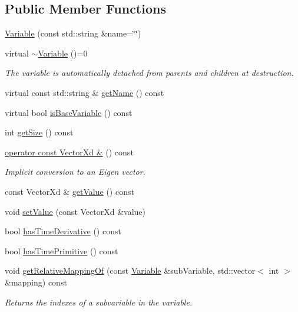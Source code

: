 \subsection*{Public Member Functions}
\begin{DoxyCompactItemize}
\item 
\hyperlink{classocra_1_1Variable_a36123e9d1eb81555292618b62a549c49}{Variable} (const std\+::string \&name=\char`\"{}\char`\"{})
\item 
virtual \hyperlink{classocra_1_1Variable_a689b72889b26a7a5280f2d13686f0a16}{$\sim$\+Variable} ()=0
\begin{DoxyCompactList}\small\item\em The variable is automatically detached from parents and children at destruction. \end{DoxyCompactList}\item 
virtual const std\+::string \& \hyperlink{classocra_1_1Variable_a4bfb964b527f719941cfe5c840e24028}{get\+Name} () const 
\item 
virtual bool \hyperlink{classocra_1_1Variable_a1c9a3b25c53a57499354c3c7581fd83a}{is\+Base\+Variable} () const 
\item 
int \hyperlink{classocra_1_1Variable_a6da81245b2bd4bb2fe794e08bbd58209}{get\+Size} () const 
\item 
\hyperlink{classocra_1_1Variable_a7e70a24f38773c67c31c5ea3389505bc}{operator const Vector\+Xd \&} () const 
\begin{DoxyCompactList}\small\item\em Implicit conversion to an Eigen vector. \end{DoxyCompactList}\item 
const Vector\+Xd \& \hyperlink{classocra_1_1Variable_a2f9c1b3fe2b115e2a2902bcba8efb9d3}{get\+Value} () const 
\item 
void \hyperlink{classocra_1_1Variable_a20990f33a83803b185f44f235d8a1be8}{set\+Value} (const Vector\+Xd \&value)
\item 
bool \hyperlink{classocra_1_1Variable_ac358daf838e870b9cd4dc3140f8fbe5a}{has\+Time\+Derivative} () const 
\item 
bool \hyperlink{classocra_1_1Variable_a40796e51f4c4debc6dee6d48466a1409}{has\+Time\+Primitive} () const 
\item 
void \hyperlink{classocra_1_1Variable_a0459c4576f1586d1c6fa2a345b4e52f4}{get\+Relative\+Mapping\+Of} (const \hyperlink{classocra_1_1Variable}{Variable} \&sub\+Variable, std\+::vector$<$ int $>$ \&mapping) const 
\begin{DoxyCompactList}\small\item\em Returns the indexes of a subvariable in the variable. \end{DoxyCompactList}\item 

\end{DoxyCompactItemize}
